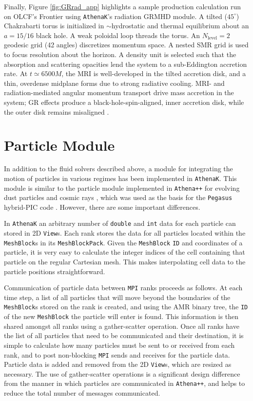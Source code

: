 \documentclass[twocolumn, floatfix]{aastex63}
\newcommand{\app}{\texttt{Athena++}}
\newcommand{\ak}{\texttt{AthenaK}}
\begin{document}
Finally, Figure \ref{fig:GRrad_app} highlights a sample production calculation run on OLCF's Frontier using \ak{}'s radiation GRMHD module. A tilted ($45^\circ$) Chakrabarti torus \citep{1985ApJ...288....1C} is initialized in $\sim$hydrostatic and thermal equilibrium about an $a=15/16$ black hole. 
A weak poloidal loop threads the torus.  An $N_\mathrm{level} = 2$ geodesic grid (42 angles) discretizes momentum space.  A nested SMR grid is used to focus resolution about the horizon.  A density unit is selected such that the absorption and scattering opacities lend the system to a sub-Eddington accretion rate.  At $t \simeq 6500M$, the MRI is well-developed in the tilted accretion disk, and a thin, overdense midplane forms due to strong radiative cooling.  MRI- and radiation-mediated angular momentum transport drive mass accretion in the system; GR effects produce a black-hole-spin-aligned, inner accretion disk, while the outer disk remains misaligned \citep{1975ApJ...195L..65B, 1983MNRAS.202.1181P}.


\section{Particle Module}

In addition to the fluid solvers described above, a module for integrating the motion of particles in various regimes has been implemented in \ak{}.  This module is similar to the particle module implemented in \app{} for evolving dust particles \citep{Bai-particles} and cosmic rays \citep{athena-particle-cr}, which was used as the basis for the {\tt Pegasus} hybrid-PIC code \citep{pegasus}.  However, there are some important differences.

In \ak{} an arbitrary number of \texttt{double} and \texttt{int} data for each particle can stored in 2D {\tt View}s.  Each rank stores the data for all particles located within the {\tt MeshBlock}s in its {\tt MeshBlockPack}. Given the {\tt MeshBlock} \texttt{ID} and coordinates of a particle, it is very easy to calculate the integer indices of the cell containing that particle on the regular Cartesian mesh.  This makes interpolating cell data to the particle positions straightforward.

Communication of particle data between \texttt{MPI} ranks proceeds as follows.  At each time step, a list of all particles that will move beyond the boundaries of
the {\tt MeshBlock}s stored on the rank is created, and using the AMR binary tree, the \texttt{ID} of the new {\tt MeshBlock} the particle will enter is found.  This information is then shared amongst all ranks using a gather-scatter operation. Once all ranks have the list of all particles that need to be communicated and their destination, it is simple to calculate how many particles must be sent to or received from each rank, and to post non-blocking \texttt{MPI} sends and receives for the particle data. Particle data is added and removed from the 2D {\tt View}s, which are resized as necessary.  The use of gather-scatter operations is a significant design difference from the manner in which particles are communicated in \app{}, and helps to reduce the total number of messages communicated.
\end{document}
